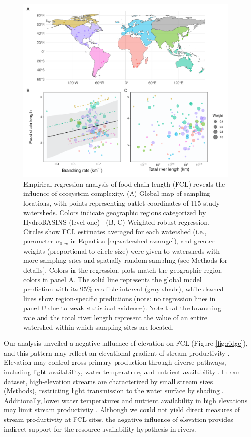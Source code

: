\documentclass[11pt, class=article, crop=false]{standalone}
\begin{document}
\begin{figure}
    \centering
    \includegraphics[width=0.9\linewidth]{output/fig_emp_fcl.pdf}
    \caption{Empirical regression analysis of food chain length (FCL) reveals the influence of ecosystem complexity. (A) Global map of sampling locations, with points representing outlet coordinates of 115 study watersheds. Colors indicate geographic regions categorized by HydroBASINS (level one) \citep{lehner_global_2013}. (B, C) Weighted robust regression. Circles show FCL estimates averaged for each watershed (i.e., parameter $\alpha_{0,w}$ in Equation \ref{eq:watershed-avarage}), and greater weights (proportional to circle size) were given to watersheds with more sampling sites and spatially random sampling (see Methods for details). Colors in the regression plots match the geographic region colors in panel A. The solid line represents the global model prediction with its 95\% credible interval (gray shade), while dashed lines show region-specific predictions (note: no regression lines in panel C due to weak statistical evidence). Note that the branching rate and the total river length represent the value of an entire watershed within which sampling sites are located.}
    \label{fig:fcl-obs}
\end{figure}

Our analysis unveiled a negative influence of elevation on FCL (Figure \ref{fig:ridge}), and this pattern may reflect an elevational gradient of stream productivity \citep{marzolf_ecosystem_2021}.
Elevation may control gross primary production through diverse pathways, including light availability, water temperature, and nutrient availability \citep{marzolf_ecosystem_2021, atkinson_determinants_2018}.
In our dataset, high-elevation streams are characterized by small stream sizes (Methods), restricting light transmission to the water surface by shading \citep{finlay_light-mediated_2011, finlay_human_2013, bernhardt_light_2022}.
Additionally, lower water temperatures and nutrient availability in high elevations may limit stream productivity \citep{demars_temperature_2011}.
Although we could not yield direct measures of stream productivity at FCL sites, the negative influence of elevation provides indirect support for the resource availability hypothesis in rivers.
\end{document}
